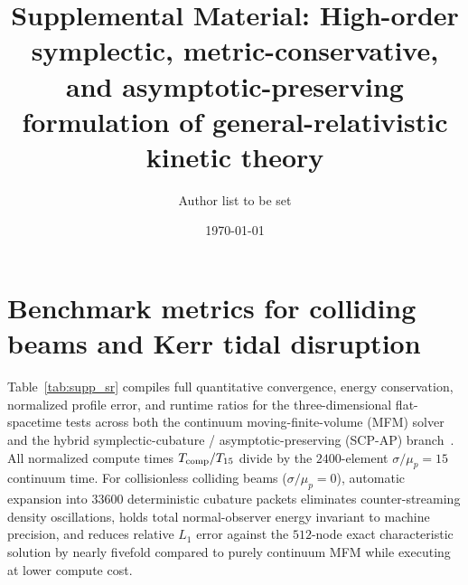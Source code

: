 \documentclass[twocolumn,prx,aps,superscriptaddress,nofootinbib,floatfix]{revtex4-2}
\begin{document}
\title{Supplemental Material: High-order symplectic, metric-conservative, and asymptotic-preserving formulation of general-relativistic kinetic theory}

\author{Author list to be set}
\noaffiliation

\date{\today}

\maketitle

\section{Benchmark metrics for colliding beams and Kerr tidal disruption}

Table~\ref{tab:supp_sr} compiles full quantitative convergence, energy conservation, normalized profile error, and runtime ratios for the three-dimensional flat-spacetime tests across both the continuum moving-finite-volume (MFM) solver~\cite{Hopkins:2026lbv} and the hybrid symplectic-cubature / asymptotic-preserving (SCP-AP) branch~\cite{Stroud:1971,Wu:2026nrpic}. All normalized compute times $T_{\rm comp}/T_{15}$ divide by the $2400$-element $\sigma/\mu_p = 15$ continuum time. For collisionless colliding beams ($\sigma/\mu_p = 0$), automatic expansion into $33600$ deterministic cubature packets eliminates counter-streaming density oscillations, holds total normal-observer energy invariant to machine precision, and reduces relative $L_1$ error against the $512$-node exact characteristic solution by nearly fivefold compared to purely continuum MFM while executing at lower compute cost.
\end{document}
